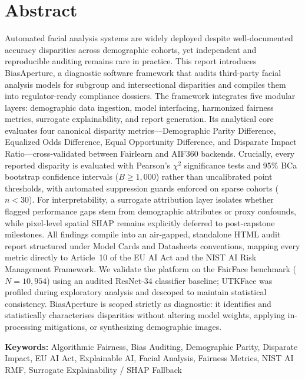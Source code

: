 \chapter*{Abstract}

Automated facial analysis systems are widely deployed despite well-documented accuracy disparities across demographic cohorts, yet independent and reproducible auditing remains rare in practice. This report introduces BiasAperture, a diagnostic software framework that audits third-party facial analysis models for subgroup and intersectional disparities and compiles them into regulator-ready compliance dossiers. The framework integrates five modular layers: demographic data ingestion, model interfacing, harmonized fairness metrics, surrogate explainability, and report generation. Its analytical core evaluates four canonical disparity metrics---Demographic Parity Difference, Equalized Odds Difference, Equal Opportunity Difference, and Disparate Impact Ratio---cross-validated between Fairlearn and AIF360 backends. Crucially, every reported disparity is evaluated with Pearson's $\chi^2$ significance tests and 95\% BCa bootstrap confidence intervals ($B \ge 1{,}000$) rather than uncalibrated point thresholds, with automated suppression guards enforced on sparse cohorts ($n < 30$). For interpretability, a surrogate attribution layer isolates whether flagged performance gaps stem from demographic attributes or proxy confounds, while pixel-level spatial SHAP remains explicitly deferred to post-capstone milestones. All findings compile into an air-gapped, standalone HTML audit report structured under Model Cards and Datasheets conventions, mapping every metric directly to Article~10 of the EU AI Act and the NIST AI Risk Management Framework. We validate the platform on the FairFace benchmark ($N = 10{,}954$) using an audited ResNet-34 classifier baseline; UTKFace was profiled during exploratory analysis and descoped to maintain statistical consistency. BiasAperture is scoped strictly as diagnostic: it identifies and statistically characterises disparities without altering model weights, applying in-processing mitigations, or synthesizing demographic images.

\vspace{1cm}
\noindent
\textbf{Keywords:} Algorithmic Fairness, Bias Auditing, Demographic Parity, Disparate Impact, EU AI Act, Explainable AI, Facial Analysis, Fairness Metrics, NIST AI RMF, Surrogate Explainability / SHAP Fallback
